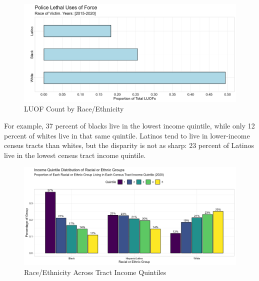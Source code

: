 \documentclass[12pt]{article}
\begin{document}
\begin{figure}[H]
  \centering
  \includegraphics[width=\linewidth]{images/race_proportion_of_total_bar}
  \captionsetup{justification=centering, singlelinecheck=false, margin=2cm}
  \caption{LUOF Count by Race/Ethnicity}
  \label{fig:race_proportion_of_total_bar}
\end{figure}
\noindent{}For example, 37 percent of blacks live in the lowest income quintile, while only 12 percent of whites live in that same quintile. Latinos tend to live in lower-income census tracts than whites, but the disparity is not as sharp: 23 percent of Latinos live in the lowest census tract income quintile.


\begin{figure}[H]
  \centering
  \includegraphics[width=\linewidth]{images/total_pop_quintiles_race}
  \captionsetup{justification=centering, singlelinecheck=false, margin=2cm}
  \caption{Race/Ethnicity Across Tract Income Quintiles}
  \label{fig:total_pop_quintiles_race}
\end{figure}

\end{document}
